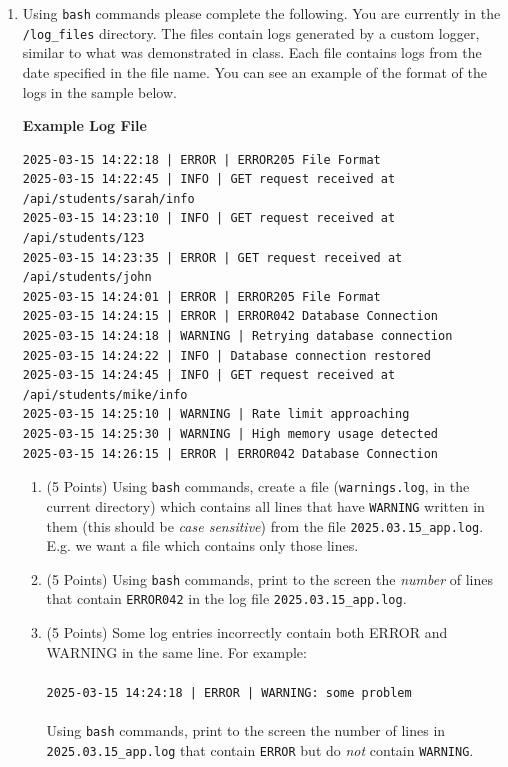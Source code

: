 \documentclass[11pt]{article}
\begin{document}
\begin{enumerate}

\item Using \texttt{bash} commands please complete the following. You are currently in the \texttt{/log\_files} directory. The files contain logs generated by a custom logger, similar to what was demonstrated in class. Each file contains logs from the date specified in the file name. You can see an example of the format of the logs in the sample below.

{\bf Example Log File}

\begin{verbatim}
2025-03-15 14:22:18 | ERROR | ERROR205 File Format
2025-03-15 14:22:45 | INFO | GET request received at /api/students/sarah/info
2025-03-15 14:23:10 | INFO | GET request received at /api/students/123
2025-03-15 14:23:35 | ERROR | GET request received at /api/students/john
2025-03-15 14:24:01 | ERROR | ERROR205 File Format
2025-03-15 14:24:15 | ERROR | ERROR042 Database Connection
2025-03-15 14:24:18 | WARNING | Retrying database connection
2025-03-15 14:24:22 | INFO | Database connection restored
2025-03-15 14:24:45 | INFO | GET request received at /api/students/mike/info
2025-03-15 14:25:10 | WARNING | Rate limit approaching
2025-03-15 14:25:30 | WARNING | High memory usage detected
2025-03-15 14:26:15 | ERROR | ERROR042 Database Connection
\end{verbatim}

\begin{enumerate}
	\item (5 Points) Using \texttt{bash} commands, create a file (\texttt{warnings.log}, in the current directory) which contains all lines that have \texttt{WARNING} written in them (this should be \emph{case sensitive}) from the file \texttt{2025.03.15\_app.log}. E.g. we want a file which contains only those lines.
\vspace{5cm}
	\item (5 Points) Using \texttt{bash} commands, print to the screen the \emph{number} of lines that contain \texttt{ERROR042} in the log file \texttt{2025.03.15\_app.log}.
\vspace{5cm}
	\item (5 Points) Some log entries incorrectly contain both ERROR and WARNING in the same line. For example: \\ \\
 \texttt{2025-03-15 14:24:18 | ERROR | WARNING: some problem} \\ \\
 Using \texttt{bash} commands, print to the screen the number of lines in \texttt{2025.03.15\_app.log} that contain \texttt{ERROR} but do \emph{not} contain \texttt{WARNING}.
\vspace{5cm}


\end{enumerate}
\end{enumerate}
\end{document}
